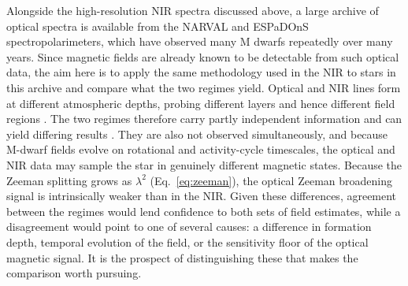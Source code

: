 
Alongside the high-resolution NIR spectra discussed above, a large archive of optical spectra is available from the NARVAL \citep{narval} and ESPaDOnS \citep{espadons} spectropolarimeters, which have observed many M dwarfs repeatedly over many years. Since magnetic fields are already known to be detectable from such optical data, the aim here is to apply the same methodology used in the NIR to stars in this archive and compare what the two regimes yield. Optical and NIR lines form at different atmospheric depths, probing different layers and hence different field regions \citep{Afram_2019, Olander_2021}. The two regimes therefore carry partly independent information and can yield differing results \citep{Petit_2021}. They are also not observed simultaneously, and because M-dwarf fields evolve on rotational and activity-cycle timescales, the optical and NIR data may sample the star in genuinely different magnetic states. Because the Zeeman splitting grows as $\lambda^2$ (Eq.~\ref{eq:zeeman}), the optical Zeeman broadening signal is intrinsically weaker than in the NIR. Given these differences, agreement between the regimes would lend confidence to both sets of field estimates, while a disagreement would point to one of several causes: a difference in formation depth, temporal evolution of the field, or the sensitivity floor of the optical magnetic signal. It is the prospect of distinguishing these that makes the comparison worth pursuing.

